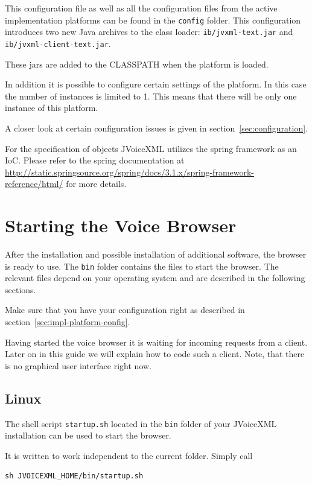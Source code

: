 \documentclass[11pt,a4paper]{book}
\begin{document}
This configuration file as well as all the configuration files from the
active implementation platforms can be found in the \lstinline{config} folder.
This configuration introduces two new Java archives to the class loader:
\lstinline{ib/jvxml-text.jar} and \lstinline{ib/jvxml-client-text.jar}.

These jars are added to the CLASSPATH when the platform is loaded.

In addition it is possible to configure certain settings of the platform. In
this case the number of instances is limited to 1. This means that there will be
only one instance of this platform.

A closer look at certain configuration issues is given in
section~\ref{sec:configuration}. 

For the specification of objects JVoiceXML utilizes the spring framework as an
IoC. Please refer to the spring documentation at
\url{http://static.springsource.org/spring/docs/3.1.x/spring-framework-reference/html/}
for more details.

\section{Starting the Voice Browser}

After the installation and possible installation of additional software, the
browser is ready to use. The \texttt{bin} folder contains the files to start
the browser. The relevant files depend on your operating system and are
described in the following sections.

Make sure that you have your configuration right as described in
section~\ref{sec:impl-platform-config}.

Having started the voice browser it is waiting for incoming requests from a
client. Later on in this guide we will explain how to code such a client.
Note, that there is no graphical user interface right now. 

\subsection{Linux}

The shell script \texttt{startup.sh} located in the \texttt{bin} folder
of your JVoiceXML installation can be used to start the browser.

It is written to work independent to the current folder. Simply call

\begin{lstlisting}
sh JVOICEXML_HOME/bin/startup.sh
\end{lstlisting}
\end{document}
